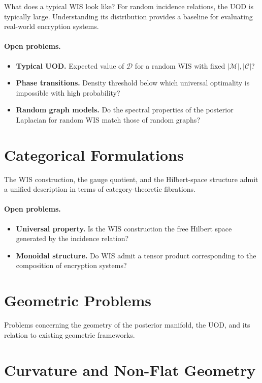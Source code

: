 What does a typical WIS look like?  For random incidence relations,
the UOD is typically large.  Understanding its distribution provides
a baseline for evaluating real-world encryption systems.

\paragraph{Open problems.}
\begin{itemize}
\item \textbf{Typical UOD.}  Expected value of $\mathcal D$ for a
random WIS with fixed $|\mathcal M|,|\mathcal C|$?
\item \textbf{Phase transitions.}  Density threshold below which
universal optimality is impossible with high probability?
\item \textbf{Random graph models.}  Do the spectral properties of the
posterior Laplacian for random WIS match those of random graphs?
\end{itemize}

\section{Categorical Formulations}\label{ch:sec:open-categorical}

The WIS construction, the gauge quotient, and the Hilbert-space
structure admit a unified description in terms of category-theoretic
fibrations.

\paragraph{Open problems.}
\begin{itemize}
\item \textbf{Universal property.}  Is the WIS construction the free
Hilbert space generated by the incidence relation?
\item \textbf{Monoidal structure.}  Do WIS admit a tensor product
corresponding to the composition of encryption systems?
\end{itemize}

\section*{Geometric Problems}

Problems concerning the geometry of the posterior manifold, the
UOD, and its relation to existing geometric frameworks.

\section{Curvature and Non-Flat Geometry}\label{ch:sec:open-curvature}


